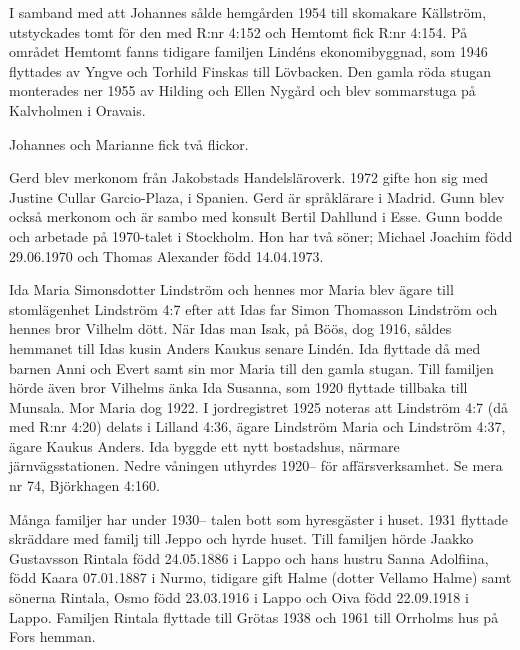 I samband med att Johannes sålde hemgården 1954 till skomakare Källström, utstyckades tomt för den med R:nr 4:152 och Hemtomt fick R:nr 4:154. På området Hemtomt fanns tidigare familjen Lindéns ekonomibyggnad, som 1946 flyttades av Yngve och Torhild Finskas till Lövbacken. Den gamla röda stugan monterades ner 1955 av Hilding och Ellen Nygård och blev sommarstuga på Kalvholmen i Oravais.

Johannes och Marianne fick två flickor.
\begin{jhchildren}
  \item {}
  \item {}
\end{jhchildren}
Gerd blev merkonom från Jakobstads Handelsläroverk. 1972 gifte hon sig med Justine Cullar Garcio-Plaza,  i Spanien. Gerd är språklärare i Madrid. Gunn blev också merkonom och är sambo med konsult Bertil Dahllund i Esse. Gunn bodde och arbetade på 1970-talet i Stockholm. Hon har två söner; Michael Joachim född 29.06.1970 och Thomas Alexander född 14.04.1973.


Ida Maria Simonsdotter Lindström och hennes mor Maria blev ägare till stomlägenhet Lindström 4:7 efter att Idas far Simon Thomasson Lindström och hennes bror Vilhelm dött. När Idas man Isak,  på Böös, dog 1916, såldes hemmanet till Idas kusin Anders Kaukus senare Lindén. Ida flyttade då med barnen Anni och Evert samt sin mor Maria till den gamla stugan. Till familjen hörde även bror Vilhelms änka Ida Susanna, som 1920 flyttade tillbaka till Munsala. Mor Maria dog 1922.  I jordregistret 1925 noteras att Lindström 4:7 (då med R:nr 4:20) delats i Lilland 4:36, ägare Lindström Maria och Lindström 4:37, ägare Kaukus Anders. Ida byggde ett nytt bostadshus, närmare järnvägsstationen. Nedre våningen uthyrdes 1920-- för affärsverksamhet. Se mera nr 74, Björkhagen 4:160.



Många familjer har under 1930-- talen bott som hyresgäster i huset. 1931 flyttade skräddare  med familj till Jeppo och hyrde huset. Till familjen hörde Jaakko Gustavsson Rintala född 24.05.1886 i Lappo och hans hustru Sanna Adolfiina, född Kaara 07.01.1887 i Nurmo, tidigare gift Halme (dotter Vellamo Halme) samt sönerna Rintala, Osmo född 23.03.1916 i Lappo och Oiva född 22.09.1918 i Lappo. Familjen Rintala  flyttade till Grötas 1938 och 1961 till Orrholms hus på Fors hemman.

